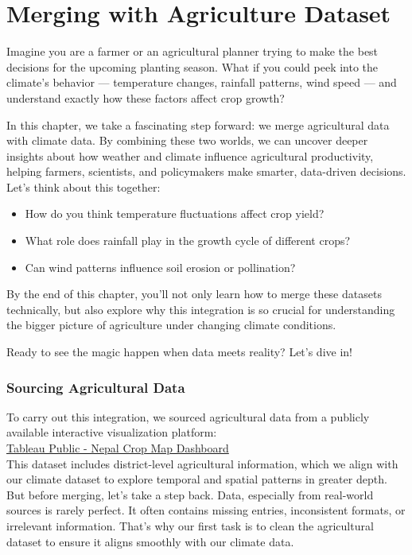\chapter{Merging with Agriculture Dataset}

Imagine you are a farmer or an agricultural planner trying to make the best decisions for the upcoming planting season. What if you could peek into the climate’s behavior — temperature changes, rainfall patterns, wind speed — and understand exactly how these factors affect crop growth?

In this chapter, we take a fascinating step forward: we merge agricultural data with climate data. By combining these two worlds, we can uncover deeper insights about how weather and climate influence agricultural productivity, helping farmers, scientists, and policymakers make smarter, data-driven decisions. Let’s think about this together:

\begin{itemize}
    \item How do you think temperature fluctuations affect crop yield?
    \item What role does rainfall play in the growth cycle of different crops?
    \item Can wind patterns influence soil erosion or pollination?
\end{itemize}

By the end of this chapter, you’ll not only learn how to merge these datasets technically, but also explore why this integration is so crucial for understanding the bigger picture of agriculture under changing climate conditions.

Ready to see the magic happen when data meets reality? Let’s dive in!

\subsection*{Sourcing Agricultural Data}
To carry out this integration, we sourced agricultural data from a publicly available interactive visualization platform: \\
\href{https://public.tableau.com/app/profile/sadichchha1369/viz/NepaCropMapwithprovinceSAMPLE_15636442141840/Dashboard1}{Tableau Public - Nepal Crop Map Dashboard}\\
This dataset includes district-level agricultural information, which we align with our climate dataset to explore temporal and spatial patterns in greater depth.
But before merging, let’s take a step back. Data, especially from real-world sources is rarely perfect. It often contains missing entries, inconsistent formats, or irrelevant information. That’s why our first task is to clean the agricultural dataset to ensure it aligns smoothly with our climate data.






